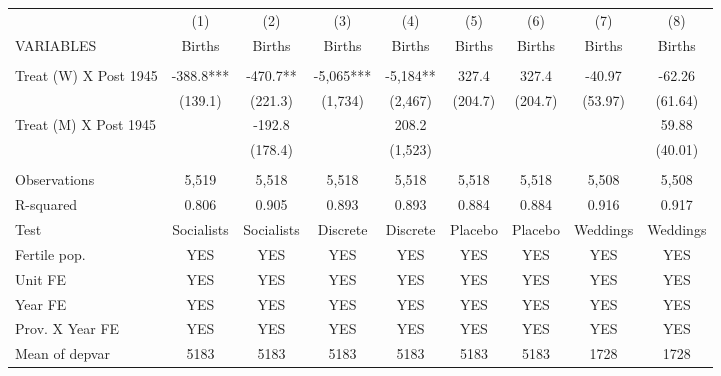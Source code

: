 \begin{tabular}{lcccccccc} \hline
 & (1) & (2) & (3) & (4) & (5) & (6) & (7) & (8) \\
VARIABLES & Births & Births & Births & Births & Births & Births & Births & Births \\ \hline
 &  &  &  &  &  &  &  &  \\
Treat (W) X Post 1945 & -388.8*** & -470.7** & -5,065*** & -5,184** & 327.4 & 327.4 & -40.97 & -62.26 \\
 & (139.1) & (221.3) & (1,734) & (2,467) & (204.7) & (204.7) & (53.97) & (61.64) \\
Treat (M) X Post 1945 &  & -192.8 &  & 208.2 &  &  &  & 59.88 \\
 &  & (178.4) &  & (1,523) &  &  &  & (40.01) \\
 &  &  &  &  &  &  &  &  \\
Observations & 5,519 & 5,518 & 5,518 & 5,518 & 5,518 & 5,518 & 5,508 & 5,508 \\
R-squared & 0.806 & 0.905 & 0.893 & 0.893 & 0.884 & 0.884 & 0.916 & 0.917 \\
Test & Socialists & Socialists & Discrete & Discrete & Placebo & Placebo & Weddings & Weddings \\
Fertile pop. & YES & YES & YES & YES & YES & YES & YES & YES \\
Unit FE & YES & YES & YES & YES & YES & YES & YES & YES \\
Year FE & YES & YES & YES & YES & YES & YES & YES & YES \\
Prov. X Year FE & YES & YES & YES & YES & YES & YES & YES & YES \\
 Mean of depvar & 5183 & 5183 & 5183 & 5183 & 5183 & 5183 & 1728 & 1728 \\ \hline
\end{tabular}
